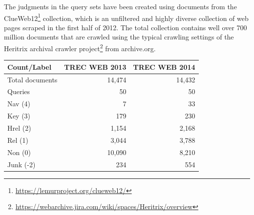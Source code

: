 The judgments in the query sets have been created using documents from the  ClueWeb12\footnote{\url{https://lemurproject.org/clueweb12/}} collection, which is an unfiltered and highly diverse collection of web pages scraped in the first half of 2012. The total collection contains well over 700 million documents that are crawled using the typical crawling settings of the Heritrix archival crawler project\footnote{\url{https://webarchive.jira.com/wiki/spaces/Heritrix/overview}} from archive.org.  

\begin{table}
  \label{tab:webstats} 
  \centering
  \begin{tabular}{ l r r }
    \toprule
    Count/Label & TREC WEB 2013 & TREC WEB 2014 \\
    \midrule
    Total documents & 14,474 & 14,432 \\
    Queries & 50 & 50 \\
    Nav (4) & 7 & 33 \\
    Key (3) & 179 & 230 \\
    Hrel (2) & 1,154 & 2,168 \\
    Rel (1) & 3,044 & 3,788 \\
    Non (0) & 10,090 & 8,210 \\
    Junk (-2) & 234 & 554 \\
    \bottomrule
  \end{tabular}
\end{table}

